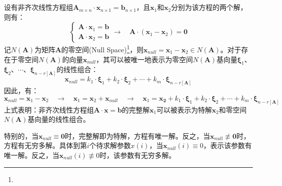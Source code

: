 \newpage
\chapter{\normf{}}

\section{}
\label{sect:null_space}
设有非齐次线性方程组$\boldsymbol{A}_{m\times n}\cdot\boldsymbol{x}_{n\times 1}=\boldsymbol{b}_{n\times 1}$，且$\boldsymbol{x}_1$和$\boldsymbol{x}_2$分别为该方程的两个解，则有：
\begin{equation}
  \begin{cases}
    \boldsymbol{A}\cdot\boldsymbol{x}_1=\boldsymbol{b} \\\boldsymbol{A}\cdot\boldsymbol{x}_2=\boldsymbol{b}
  \end{cases}\to\quad\boldsymbol{A}\cdot(\boldsymbol{x}_1-\boldsymbol{x}_2)=\boldsymbol{0}
\end{equation}
记$N(\boldsymbol{A})$为矩阵$\boldsymbol{A}$的零空间(Null Space)\footnote{}，则$\boldsymbol{x}_{null}=\boldsymbol{x}_1-\boldsymbol{x}_2\in N(\boldsymbol{A})$。对于存在于零空间$N(\boldsymbol{A})$的向量$\boldsymbol{x}_{null}$，其可以被唯一地表示为零空间$N(\boldsymbol{A})$基向量$\boldsymbol{\xi}_1$、$\boldsymbol{\xi}_2$、$\cdots$、$\boldsymbol{\xi}_{n-r[\boldsymbol{A}]}$的线性组合：
\begin{equation}
  \boldsymbol{x}_{null}=k_1\cdot\boldsymbol{\xi}_1+k_2\cdot\boldsymbol{\xi}_2+\cdots+k_m\cdot\boldsymbol{\xi}_{n-r[\boldsymbol{A}]}
\end{equation}
因此，有：
\begin{equation}
  \boldsymbol{x}_{null}=\boldsymbol{x}_1-\boldsymbol{x}_2\quad\to\quad\boldsymbol{x}_1=\boldsymbol{x}_2+\boldsymbol{x}_{null}\quad\to\quad\boldsymbol{x}_1=\boldsymbol{x_2}+k_1\cdot\boldsymbol{\xi}_1+k_2\cdot\boldsymbol{\xi}_2+\cdots+k_m\cdot\boldsymbol{\xi}_{n-r[\boldsymbol{A}]}
\end{equation}
上式表明：非齐次线性方程组$\boldsymbol{A}\cdot\boldsymbol{x}=\boldsymbol{b}$的完整解$\boldsymbol{x}_1$可以被表示为特解$\boldsymbol{x}_2$和零空间$N(\boldsymbol{A})$基向量的线性组合。

特别的，当$\boldsymbol{x}_{null}\equiv\boldsymbol{0}$时，完整解即为特解，方程有唯一解。反之，当$\boldsymbol{x}_{null}\not\equiv\boldsymbol{0}$时，方程有无穷多解。具体到第$i$个待求解参数$x(i)$，当$\boldsymbol{x}_{null}(i)\equiv0$，表示该参数有唯一解。反之，当$\boldsymbol{x}_{null}(i)\not\equiv0$时，该参数有无穷多解。

